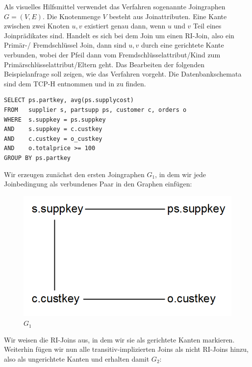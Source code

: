 Als visuelles Hilfsmittel verwendet das Verfahren sogenannte Joingraphen $G=(V,E)$. Die Knotenmenge $V$ besteht aus Joinattributen. Eine Kante zwischen zwei Knoten $u,v$ existiert genau dann, wenn $u$ und $v$ Teil eines Joinprädikates sind. Handelt es sich bei dem Join um einen RI-Join, also ein Primär-/ Fremdschlüssel Join, dann sind $u,v$ durch eine gerichtete Kante verbunden, wobei der Pfeil dann vom Fremdschlüsselattribut/Kind zum Primärschlüsselattribut/Eltern geht. Das Bearbeiten der folgenden Beispielanfrage soll zeigen, wie das Verfahren vorgeht. Die Datenbankschemata sind dem TCP-H entnommen und in \cite{partsubdb} zu finden.

\begin{lstlisting}[mathescape]
SELECT ps.partkey, avg(ps.supplycost)
FROM   supplier s, partsupp ps, customer c, orders o
WHERE  s.suppkey = ps.suppkey 
AND    s.suppkey = c.custkey
AND    c.custkey = o_custkey
AND    o.totalprice >= 100
GROUP BY ps.partkey
\end{lstlisting}

Wir erzeugen zunächst den ersten Joingraphen $G_1$, in dem wir jede Joinbedingung als verbundenes Paar in den Graphen einfügen:

\begin{figure}[H]
\centering
\includegraphics[scale=0.4]{Bilder/joinelem_g1.png}
\caption{$G_1$}
\end{figure}

Wir weisen die RI-Joins aus, in dem wir sie als gerichtete Kanten markieren. Weiterhin fügen wir nun alle transitiv-implizierten Joins als nicht RI-Joins hinzu, also als ungerichtete Kanten und erhalten damit $G_2$:

